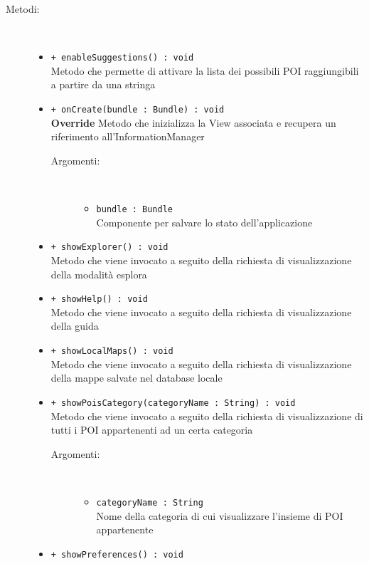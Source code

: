 \documentclass[../DefinizioneDiProdotto.tex]{subfiles}
\begin{document}
\begin{description}
\begin{itemize}
\end{itemize}
\item[Metodi:] \
\begin{itemize}
\item \texttt{+ enableSuggestions() : void}\\
Metodo che permette di attivare la lista dei possibili POI raggiungibili a partire da una stringa
 \item \texttt{+ onCreate(bundle : Bundle) : void}\\
\textbf{Override} Metodo che inizializza la View associata e recupera un riferimento all'InformationManager
 \begin{description}
\item[Argomenti:] \
\begin{itemize}
\item \texttt{bundle : Bundle}\\
Componente per salvare lo stato dell'applicazione\end{itemize}
\end{description}
\item \texttt{+ showExplorer() : void}\\
Metodo che viene invocato a seguito della richiesta di visualizzazione della modalità esplora
 \item \texttt{+ showHelp() : void}\\
Metodo che viene invocato a seguito della richiesta di visualizzazione della guida
 \item \texttt{+ showLocalMaps() : void}\\
Metodo che viene invocato a seguito della richiesta di visualizzazione della mappe salvate nel database locale
 \item \texttt{+ showPoisCategory(categoryName : String) : void}\\
Metodo che viene invocato a seguito della richiesta di visualizzazione di tutti i POI appartenenti ad un certa categoria
 \begin{description}
\item[Argomenti:] \
\begin{itemize}
\item \texttt{categoryName : String}\\
Nome della categoria di cui visualizzare l'insieme di POI appartenente\end{itemize}
\end{description}
\item \texttt{+ showPreferences() : void}\\

\end{itemize}
\end{description}
\end{document}
